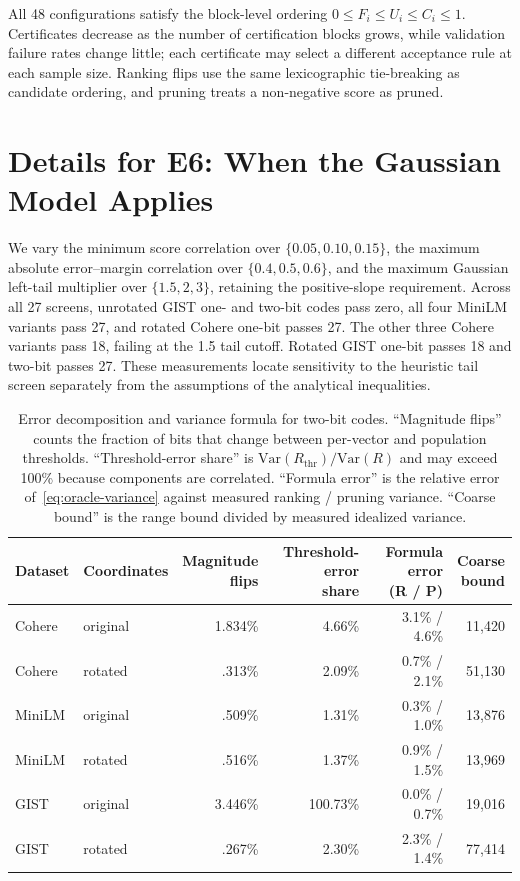 All 48 configurations satisfy the block-level ordering $0\le F_i\le U_i\le C_i\le1$. Certificates decrease as the number of certification blocks grows, while validation failure rates change little; each certificate may select a different acceptance rule at each sample size. Ranking flips use the same lexicographic tie-breaking as candidate ordering, and pruning treats a non-negative score as pruned.

\section{Details for E6: When the Gaussian Model Applies}
\label{app:eligibility}

We vary the minimum score correlation over $\{0.05,0.10,0.15\}$, the maximum absolute error--margin correlation over $\{0.4,0.5,0.6\}$, and the maximum Gaussian left-tail multiplier over $\{1.5,2,3\}$, retaining the positive-slope requirement. Across all 27 screens, unrotated GIST one- and two-bit codes pass zero, all four MiniLM variants pass 27, and rotated Cohere one-bit passes 27. The other three Cohere variants pass 18, failing at the 1.5 tail cutoff. Rotated GIST one-bit passes 18 and two-bit passes 27. These measurements locate sensitivity to the heuristic tail screen separately from the assumptions of the analytical inequalities.

\begin{table}[tbp]
\centering


\small
\begin{tabular}{llrrrr}
\toprule
Dataset & Coordinates & \shortstack{Magnitude\\flips} & \shortstack{Threshold-error\\share} & \shortstack{Formula error\\(R / P)} & \shortstack{Coarse\\bound} \\
\midrule
Cohere & original & 1.834\% & 4.66\% & 3.1\% / 4.6\% & 11{,}420 \\
Cohere & rotated & .313\% & 2.09\% & 0.7\% / 2.1\% & 51{,}130 \\
MiniLM & original & .509\% & 1.31\% & 0.3\% / 1.0\% & 13{,}876 \\
MiniLM & rotated & .516\% & 1.37\% & 0.9\% / 1.5\% & 13{,}969 \\
GIST & original & 3.446\% & 100.73\% & 0.0\% / 0.7\% & 19{,}016 \\
GIST & rotated & .267\% & 2.30\% & 2.3\% / 1.4\% & 77{,}414 \\
\bottomrule
\end{tabular}

\small
\caption{Error decomposition and variance formula for two-bit codes. ``Magnitude flips'' counts the fraction of bits that change between per-vector and population thresholds. ``Threshold-error share'' is $\mathrm{Var}(R_{\mathrm{thr}})/\mathrm{Var}(R)$ and may exceed 100\% because components are correlated. ``Formula error'' is the relative error of~\eqref{eq:oracle-variance} against measured ranking / pruning variance. ``Coarse bound'' is the range bound divided by measured idealized variance.}
\label{tab:app-p5}
\end{table}

